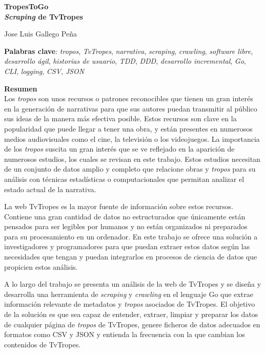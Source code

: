 \thispagestyle{empty}

\begin{center}
{\large\bfseries TropesToGo \\ \textit{Scraping} de TvTropes }\\
\end{center}
\begin{center}
Jose Luis Gallego Peña\\
\end{center}


\vspace{0.5cm}
\noindent\textbf{Palabras clave}: \textit{tropos}, \textit{TvTropes},
\textit{narrativa}, \textit{scraping}, \textit{crawling}, \textit{software
libre}, \textit{desarrollo ágil}, \textit{historias de usuario}, \textit{TDD},
\textit{DDD}, \textit{desarrollo incremental}, \textit{Go}, \textit{CLI},
\textit{logging}, \textit{CSV},
\textit{JSON}
\vspace{0.7cm}

\noindent\textbf{Resumen}\\
	
Los \textit{tropos} son unos recursos o patrones reconocibles que tienen un gran
interés en la generación de narrativas para que sus autores puedan transmitir al
público sus ideas de la manera más efectiva posible. Estos recursos son clave en
la popularidad que puede llegar a tener una obra, y están presentes en numerosos
medios audiovisuales como el cine, la televisión o los videojuegos. La
importancia de los \textit{tropos} suscita un gran interés que se ve reflejado
en la aparición de numerosos estudios, los cuales se revisan en este trabajo.
Estos estudios necesitan de un conjunto de datos amplio y completo que relacione
obras y \textit{tropos} para su análisis con técnicas estadísticas o
computacionales que permitan analizar el estado actual de la narrativa.

La web TvTropes es la mayor fuente de información sobre estos recursos. Contiene
una gran cantidad de datos no estructurados que únicamente están pensados para
ser legibles por humanos y no están organizados ni preparados para su
procesamiento en un ordenador. En este trabajo se ofrece una solución a
investigadores y programadores para que puedan extraer estos datos según las
necesidades que tengan y puedan integrarlos en procesos de ciencia de datos que
propicien estos análisis.

A lo largo del trabajo se presenta un análisis de la web de TvTropes y se diseña
y desarrolla una herramienta de \textit{scraping} y \textit{crawling} en el
lenguaje Go que extrae información relevante de metadatos y \textit{tropos}
asociados de TvTropes. El objetivo de la solución es que sea capaz de entender,
extraer, limpiar y preparar los datos de cualquier página de \textit{tropos} de
TvTropes, genere ficheros de datos adecuados en formatos como CSV y JSON y
entienda la frecuencia con la que cambian los contenidos de TvTropes.

